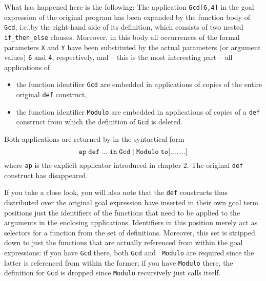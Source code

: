 What has happened here is the following:
The application {\tt Gcd[6,4]} in the goal expression of the original program
has been expanded by 
the function body of {\tt Gcd}, i.e.,by the right-hand side of its
definition, which consists of two nested 
{\tt if\_then\_else} clauses. 
Moreover, in this body all occurrences of the formal parameters {\tt X} and
{\tt Y} have been substituted by the actual parameters (or argument values)
{\tt 6} and {\tt 4}, respectively, and -- this is the most interesting part --
 all applications of
\begin{itemize} 
\item the function identifier {\tt Gcd} are embedded in applications of 
copies of the entire original {\tt def} construct,
\item the function identifier {\tt Modulo} are embedded in  applications
of copies of a {\tt def} construct from which
 the definition of {\tt Gcd} is deleted. 
\end{itemize}
Both applications are returned by \pired in the syntactical form
$$
{\tt ap \; def \; ... \; in\; Gcd\; |\; Modulo  \; to [ ..., ...] }
$$
where {\tt ap} is the explicit {\mys applicator} introduced in chapter 2.
The original {\tt def} construct has disappeared.

If you take a close look, you will also note that
the {\tt def} constructs thus distributed over the original 
goal expression have inserted in their own goal term positions
just the identifiers of the functions that need to
be applied to the arguments in the enclosing applications. 
Identifiers in this position merely act as selectors for a
function from the set of definitions. Moreover, this set 
is stripped down to
 just the functions that are actually referenced from within
the goal expressions: if you have {\tt Gcd} there, both {\tt Gcd} and {\tt
Modulo} are required since the latter is referenced from within the former;
if you have {\tt Modulo} there, the definition for {\tt Gcd} is dropped
since {\tt Modulo} recursively just calls itself. 

